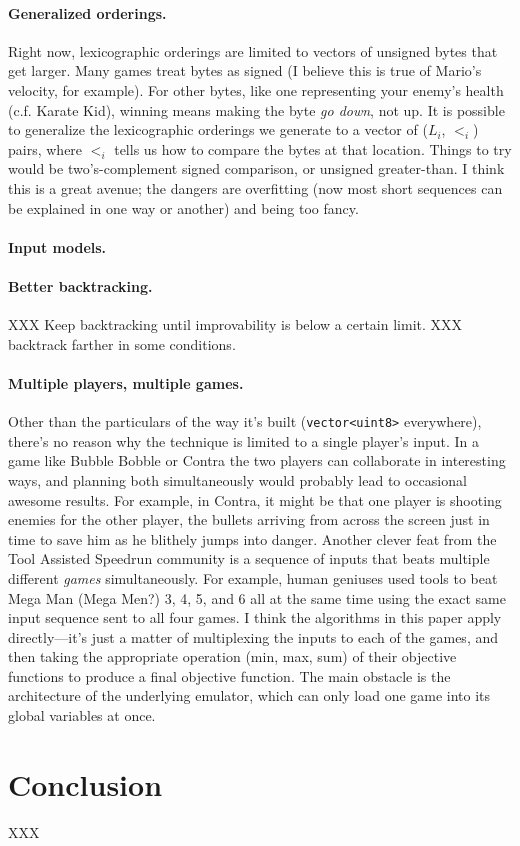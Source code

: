 \documentclass[twocolumn]{article}
\begin{document}
\paragraph{Generalized orderings.} Right now, lexicographic orderings
are limited to vectors of unsigned bytes that get larger. Many games
treat bytes as signed (I believe this is true of Mario's velocity, for
example). For other bytes, like one representing your enemy's health
(c.f. Karate Kid), winning means making the byte {\em go down}, not
up. It is possible to generalize the lexicographic orderings we
generate to a vector of ($L_i$, $<_i$) pairs, where $<_i$ tells us
how to compare the bytes at that location. Things to try would be
two's-complement signed comparison, or unsigned greater-than. I think
this is a great avenue; the dangers are overfitting (now most short
sequences can be explained in one way or another) and being too fancy.

\paragraph{Input models.}

\paragraph{Better backtracking.}
XXX Keep backtracking until improvability is below a certain limit.
XXX backtrack farther in some conditions.

\paragraph{Multiple players, multiple games.} Other than the particulars
of the way it's built (\verb+vector<uint8>+ everywhere), there's no
reason why the technique is limited to a single player's input. In a
game like Bubble Bobble or Contra the two players can collaborate in
interesting ways, and planning both simultaneously would probably lead
to occasional awesome results. For example, in Contra, it might be
that one player is shooting enemies for the other player, the bullets
arriving from across the screen just in time to save him as he
blithely jumps into danger. Another clever feat from the Tool Assisted
Speedrun community is a sequence of inputs that beats multiple
different {\em games} simultaneously. For example, human geniuses used
tools to beat Mega Man (Mega Men?) 3, 4, 5, and 6 all at the same time
using the exact same input sequence sent to all four
games.\cite{BaxterTAS} I think the algorithms in this paper apply
directly---it's just a matter of multiplexing the inputs to each of
the games, and then taking the appropriate operation (min, max, sum) of
their objective functions to produce a final objective function. The
main obstacle is the architecture of the underlying emulator, which
can only load one game into its global variables at once.

\section{Conclusion}

XXX



\end{document}
